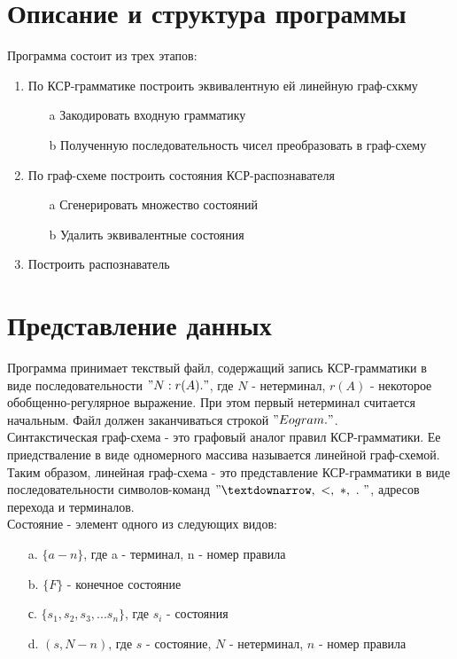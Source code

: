\documentclass[12pt]{article}
\newcommand\tab[1][1cm]{\hspace*{#1}}
\begin{document}
\section{Описание и структура программы}
Программа состоит из трех этапов:
\begin{enumerate}
\item По КСР-грамматике построить эквивалентную ей линейную граф-схкму
	\begin{enumerate}
		\item[a] Закодировать входную грамматику
		\item[b] Полученную последовательность чисел преобразовать в граф-схему
	\end{enumerate}
\item По граф-схеме построить состояния КСР-распознавателя
	\begin{enumerate}
		\item[a] Сгенерировать множество состояний
		\item[b] Удалить эквивалентные состояния
	\end{enumerate}
\item Построить распознаватель
\end{enumerate}

\section{Представление данных}
\tab Программа принимает текствый файл, содержащий запись КСР-грамматики в виде последовательности $"N : r(A)."$, где $N$ - нетерминал, $r(A)$ - некоторое обобщенно-регулярное выражение. При этом первый нетерминал считается начальным. Файл должен заканчиваться строкой $"Eogram."$.\\

Синтакстическая граф-схема - это графовый аналог правил КСР-грамматики. Ее приедстваление в виде одномерного массива называется линейной граф-схемой.
Таким образом, линейная граф-схема - это представление КСР-грамматики в виде последовательности символов-команд $"↓,\ <,\ *,\ .\ "$, адресов перехода и терминалов.\\

Состояние - элемент одного из следующих видов: 
\begin{enumerate}
\item[a.] $\{ a - n \}$, где a - терминал, n - номер правила
\item[b.] $\{ F \}$ - конечное состояние
\item[с.] $\{ s_1, s_2, s_3, ... s_n\}$, где $s_i$ - состояния
\item[d.] $( s, N - n )$, где $s$ - состояние, $N$ - нетерминал, $n$ - номер правила
\end{enumerate}
\end{document}
